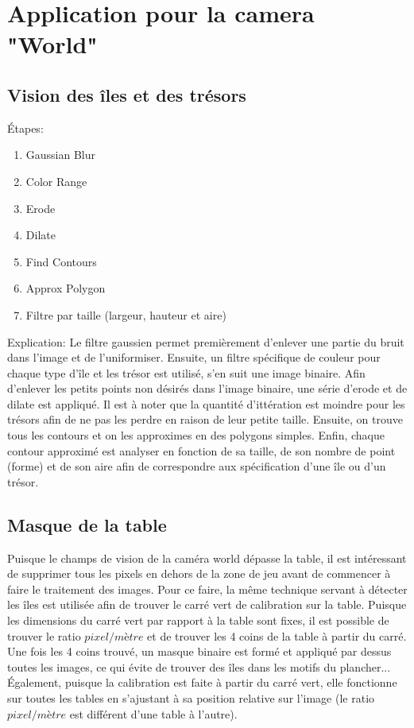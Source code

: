 \section{Application pour la camera "World"} 

\subsection{Vision des îles et des trésors}

Étapes:
\begin{enumerate}
\item Gaussian Blur
\item Color Range
\item Erode
\item Dilate
\item Find Contours
\item Approx Polygon
\item Filtre par taille (largeur, hauteur et aire)
\end{enumerate}

Explication: Le filtre gaussien permet premièrement d'enlever une partie du bruit dans l'image et de l'uniformiser. Ensuite, un filtre spécifique de couleur pour chaque type d'île et les trésor est utilisé, s'en suit une image binaire. Afin d'enlever les petits points non désirés dans l'image binaire, une série d'erode et de dilate est appliqué. Il est à noter que la quantité d'ittération est moindre pour les trésors afin de ne pas les perdre en raison de leur petite taille. Ensuite, on trouve tous les contours et on les approximes en des polygons simples. Enfin, chaque contour approximé est analyser en fonction de sa taille, de son nombre de point (forme) et de son aire afin de correspondre aux spécification d'une île ou d'un trésor. 

\subsection{Masque de la table}

Puisque le champs de vision de la caméra world dépasse la table, il est intéressant de supprimer tous les pixels en dehors de la zone de jeu avant de commencer à faire le traitement des images. Pour ce faire, la même technique servant à détecter les îles est utilisée afin de trouver le carré vert de calibration sur la table. Puisque les dimensions du carré vert par rapport à la table sont fixes, il est possible de trouver le ratio $pixel/mètre$ et de trouver les 4 coins de la table à partir du carré. Une fois les 4 coins trouvé, un masque binaire est formé et appliqué par dessus toutes les images, ce qui évite de trouver des îles dans les motifs du plancher... Également, puisque la calibration est faite à partir du carré vert, elle fonctionne sur toutes les tables en s'ajustant à sa position relative sur l'image (le ratio $pixel/mètre$ est différent d'une table à l'autre).


